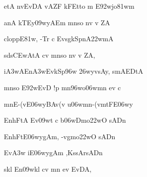 {\dn etA nvEvDA vAZF kFEt\0to m\? E\392wjo\381wm \vegdn\dontdisplaylinenum}



{\dn anA kTEy\309wyAEm mnso nv v\4 ZA \dontdisplaylinenum}

{\dn cloppE\381w, -T\4r\2 c Evsg\0kSpnA\322wmA{\dandadn}\dontdisplaylinenum }

{\dn sds\3CEwAtA c\4v mnso nv v\4 ZA, \vegdn\dontdisplaylinenum}

{\dn i\3A3wAEn\3A3wEvkSp\396w \326wyvsAy, smAEDtA{\dandabdn} \dontdisplaylinenum}

{\dn mnso E\392wEvD\2 !p\2 mn\396wo\306wmn ev c \vegdn\dontdisplaylinenum}

{\dn mnE-(vE\306wyBAv(v\? u\306wmn-(vmtFE\306wy\?{\dandabdn} \dontdisplaylinenum}

{\dn EnhFtA Ev\309wt\2 c b\306wDmo\322wO  sADn \vegdn\dontdisplaylinenum}

{\dn EnhFt\?E\306wyg\5Am, -vg\0mo\322wO  sADn \dontdisplaylinenum}

{\dn Ev\3A3w\? iE\306wyg\5Am\? ,Ks\2sArsADn \vegdn\dontdisplaylinenum}

{\dn skl\2 En\309wkl\2 c\4v mn ev Ev\0DA,{\dandabdn} \dontdisplaylinenum}


